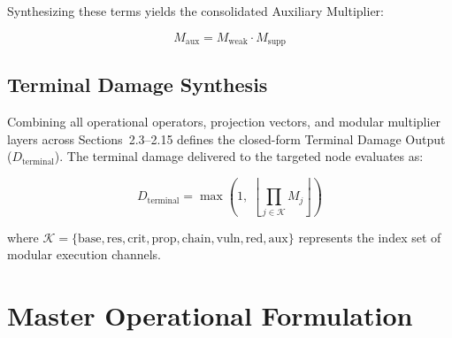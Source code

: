 \documentclass[twocolumn,10pt]{article}
\begin{document}
Synthesizing these terms yields the consolidated Auxiliary Multiplier:

\begin{equation}
\label{eq:aux_multiplier}
  M_{\text{aux}} = M_{\text{weak}} \cdot M_{\text{supp}}
\end{equation}

\subsection{Terminal Damage Synthesis}
\label{sec:terminal_damage_synthesis}
Combining all operational operators, projection vectors, and modular multiplier layers across Sections~2.3--2.15 defines the closed-form Terminal Damage Output ($D_{\text{terminal}}$). The terminal damage delivered to the targeted node evaluates as:

\begin{equation}
\label{eq:terminal_damage_synthesis}
  D_{\text{terminal}} = \max \left( 1, \; \left\lfloor \prod_{j \in \mathcal{K}} M_j \right\rfloor \right)
\end{equation}

where $\mathcal{K} = \{\text{base}, \text{res}, \text{crit}, \text{prop}, \text{chain}, \text{vuln}, \text{red}, \text{aux}\}$ represents the index set of modular execution channels.

\newpage

\section{Master Operational Formulation}
\label{sec:master_formula}
\end{document}
